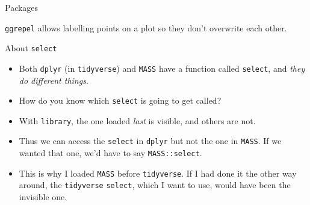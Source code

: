 \documentclass[unknownkeysallowed]{beamer}\usepackage[]{graphicx}\usepackage[]{color}
\makeatletter
\newenvironment{kframe}{%
 \def\at@end@of@kframe{}%
 \ifinner\ifhmode%
  \def\at@end@of@kframe{\end{minipage}}%
  \begin{minipage}{\columnwidth}%
 \fi\fi%
 \def\FrameCommand##1{\hskip\@totalleftmargin \hskip-\fboxsep
 \colorbox{shadecolor}{##1}\hskip-\fboxsep
     \hskip-\linewidth \hskip-\@totalleftmargin \hskip\columnwidth}%
 \MakeFramed {\advance\hsize-\width
   \@totalleftmargin\z@ \linewidth\hsize
   \@setminipage}}%
 {\par\unskip\endMakeFramed%
 \at@end@of@kframe}
\newenvironment{knitrout}{}{} %
\makeatother
\begin{document}
\begin{frame}[fragile]{Packages}
\begin{knitrout}
\begin{kframe}
{\ttfamily\noindent\itshape\color{messagecolor}{\#\# \\\#\# Attaching package: 'plyr'}}

{\ttfamily\noindent\itshape\color{messagecolor}{\#\# The following objects are masked from 'package:dplyr':\\\#\# \\\#\#\ \ \ \  arrange, count, desc, failwith, id, mutate, rename, summarise, summarize}}

{\ttfamily\noindent\itshape\color{messagecolor}{\#\# The following object is masked from 'package:purrr':\\\#\# \\\#\#\ \ \ \  compact}}

{\ttfamily\noindent\itshape\color{messagecolor}{\#\# Loading required package: scales}}

{\ttfamily\noindent\itshape\color{messagecolor}{\#\# \\\#\# Attaching package: 'scales'}}

{\ttfamily\noindent\itshape\color{messagecolor}{\#\# The following object is masked from 'package:purrr':\\\#\# \\\#\#\ \ \ \  discard}}

{\ttfamily\noindent\itshape\color{messagecolor}{\#\# The following object is masked from 'package:readr':\\\#\# \\\#\#\ \ \ \  col\_factor}}

{\ttfamily\noindent\itshape\color{messagecolor}{\#\# Loading required package: grid}}\end{kframe}
\end{knitrout}

\texttt{ggrepel} allows labelling points on a plot so they don't
overwrite each other.
\end{frame}

\begin{frame}[fragile]{About \texttt{select}}
  
  \begin{itemize}
  \item Both \texttt{dplyr} (in \texttt{tidyverse}) and \texttt{MASS}
    have a function called \texttt{select}, and \emph{they do
      different things}.
  \item How do you know which \texttt{select} is going to get called? 
  \item With \texttt{library}, the one loaded \emph{last} is visible,
    and others are not.
  \item Thus we can access the \texttt{select} in \texttt{dplyr} but
    not the one in \texttt{MASS}. If we wanted that one, we'd have to
    say \texttt{MASS::select}.
  \item This is why I loaded \texttt{MASS} before
    \texttt{tidyverse}. If I had done it the other way around, the
    \texttt{tidyverse} \texttt{select}, which I want to use, would have
    been the invisible one.  
  \end{itemize}
\end{frame}
\end{document}
